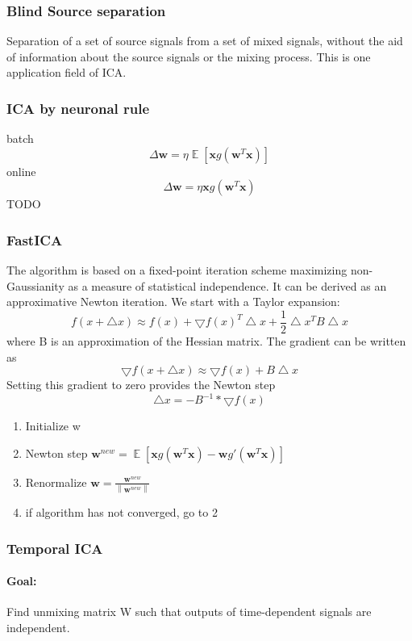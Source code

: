 \documentclass[11pt]{article}
\DeclareMathOperator{\E}{\mathbb{E}}
\newcommand{\vectornorm}[1]{\left\|#1\right\|}
\begin{document}
\subsubsection{Blind Source separation}
Separation of a set of source signals from a set of mixed signals, without the aid of information about the source signals or the mixing process. This is one application field of ICA.

\subsubsection{ICA by neuronal rule}
batch
\[
\Delta \mathbf{w}=\eta\E\left[\mathbf{x}g(\mathbf{w}^T\mathbf{x})\right]
\]
online
\[
\Delta \mathbf{w}=\eta \mathbf{x} g(\mathbf{w}^T\mathbf{x})
\]
\textsc{TODO}

\subsubsection{FastICA}
The algorithm is based on a fixed-point iteration scheme maximizing non-Gaussianity as a measure of statistical independence. It can be derived as an approximative Newton iteration. We start with a Taylor expansion:
\[
	f(x + \bigtriangleup x) \approx f(x) + \bigtriangledown f(x)^T \bigtriangleup x + \frac{1}{2} \bigtriangleup x^T B \bigtriangleup x
\]
where B is an approximation of the Hessian matrix. The gradient can be written as
\[
	\bigtriangledown f(x + \bigtriangleup x) \approx \bigtriangledown f(x) + B \bigtriangleup x
\]
Setting this gradient to zero provides the Newton step
\[
	\bigtriangleup x = - B^{-1} * \bigtriangledown f(x)
\]
\begin{enumerate}
\item Initialize w
\item Newton step $\mathbf{w}^{new}=\E \left[\mathbf{x}g(\mathbf{w}^T\mathbf{x})-\mathbf{w}g'(\mathbf{w}^T\mathbf{x})\right]$
\item Renormalize $\mathbf{w}=\frac{\mathbf{w}^{new}}{\vectornorm{\mathbf{w}^{new}}}$
\item if algorithm has not converged, go to 2
\end{enumerate}
\subsubsection{Temporal ICA}
\paragraph{Goal:} Find unmixing matrix W such that outputs of time-dependent signals are independent. 
\end{document}
